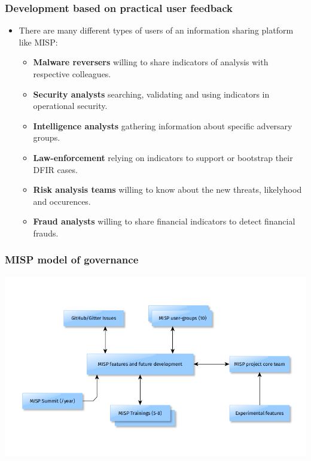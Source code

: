 \begin{frame}
\frametitle{Development based on practical user feedback}
\begin{itemize}
\item There are many different types of users of an information sharing platform like MISP:
        \begin{itemize}
                \item {\bf Malware reversers} willing to share indicators of analysis with respective colleagues.
                \item {\bf Security analysts} searching, validating and using indicators in operational security.
                \item {\bf Intelligence analysts} gathering information about specific adversary groups.
                \item {\bf Law-enforcement} relying on indicators to support or bootstrap their DFIR cases.
                \item {\bf Risk analysis teams} willing to know about the new threats, likelyhood and occurences.
                \item {\bf Fraud analysts} willing to share financial indicators to detect financial frauds.
        \end{itemize}
\end{itemize}
\end{frame}

\begin{frame}
\frametitle{MISP model of governance}
\includegraphics[scale=0.4]{governance.png}
\end{frame}

